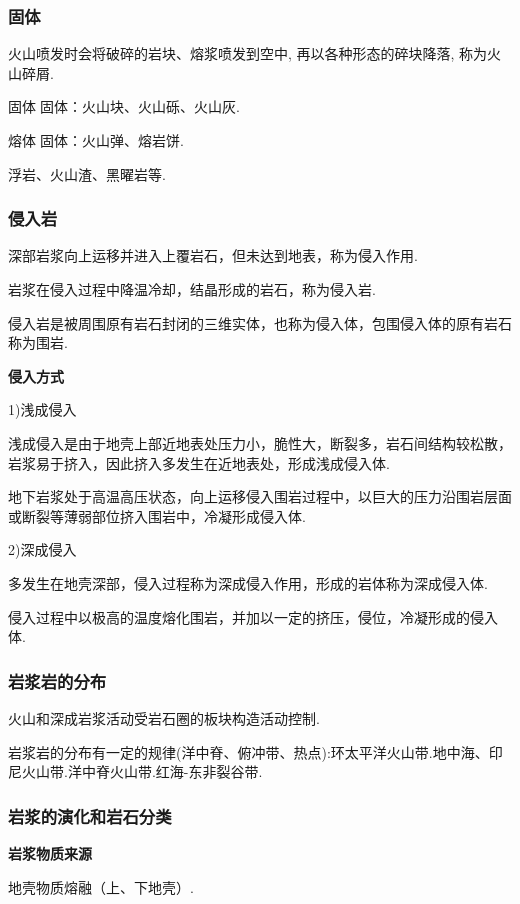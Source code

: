\documentclass[12pt,a4paper]{article}
\begin{document}
	\subsubsection{固体}
	
	火山喷发时会将破碎的岩块、熔浆喷发到空中, 再以各种形态的碎块降落, 称为火山碎屑.
	
	固体固体：火山块、火山砾、火山灰.
	
	熔体固体：火山弹、熔岩饼.
	
	浮岩、火山渣、黑曜岩等.
	
	\subsubsection{侵入岩}
	
	深部岩浆向上运移并进入上覆岩石，但未达到地表，称为侵入作用.
	
	岩浆在侵入过程中降温冷却，结晶形成的岩石，称为侵入岩.
	
	侵入岩是被周围原有岩石封闭的三维实体，也称为侵入体，包围侵入体的原有岩石称为围岩.
	
	\textbf{侵入方式}
	
	1)浅成侵入
	
	浅成侵入是由于地壳上部近地表处压力小，脆性大，断裂多，岩石间结构较松散，岩浆易于挤入，因此挤入多发生在近地表处，形成浅成侵入体.
	
	地下岩浆处于高温高压状态，向上运移侵入围岩过程中，以巨大的压力沿围岩层面或断裂等薄弱部位挤入围岩中，冷凝形成侵入体.
	
	2)深成侵入
	
	多发生在地壳深部，侵入过程称为深成侵入作用，形成的岩体称为深成侵入体.
	
	侵入过程中以极高的温度熔化围岩，并加以一定的挤压，侵位，冷凝形成的侵入体.
	
	\subsubsection{岩浆岩的分布}
	
	火山和深成岩浆活动受岩石圈的板块构造活动控制.
	
	岩浆岩的分布有一定的规律(洋中脊、俯冲带、热点):环太平洋火山带.地中海、印尼火山带.洋中脊火山带.红海-东非裂谷带.
	
	\subsubsection{岩浆的演化和岩石分类}
	\textbf{岩浆物质来源}
	
	地壳物质熔融（上、下地壳）.
	
\end{document}
